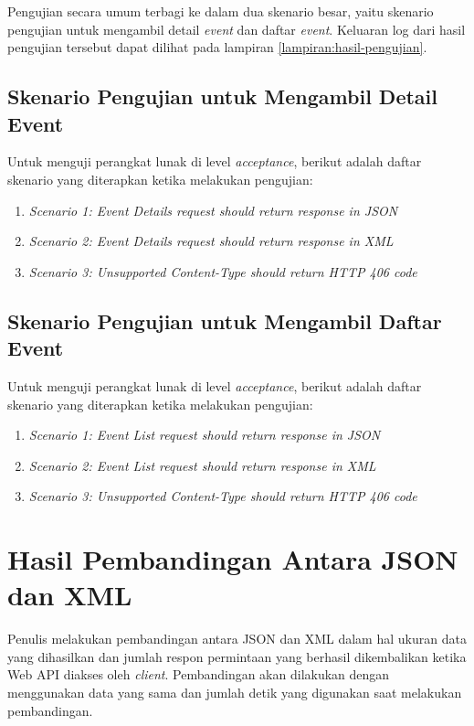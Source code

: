 \documentclass[a4paper, 12pt, oneside]{report}
\begin{document}
Pengujian secara umum terbagi ke dalam dua skenario besar, yaitu skenario pengujian untuk mengambil detail \textit{event} dan daftar \textit{event}. Keluaran log dari hasil pengujian tersebut dapat dilihat pada lampiran \ref{lampiran:hasil-pengujian}.

\subsection{Skenario Pengujian untuk Mengambil Detail Event}

Untuk menguji perangkat lunak di level \textit{acceptance}, berikut adalah daftar skenario yang diterapkan ketika melakukan pengujian:

\begin{enumerate}
  \item \textit{Scenario 1: Event Details request should return response in JSON}
  \item \textit{Scenario 2: Event Details request should return response in XML}
  \item \textit{Scenario 3: Unsupported Content-Type should return HTTP 406 code}
\end{enumerate}

\subsection{Skenario Pengujian untuk Mengambil Daftar Event}

Untuk menguji perangkat lunak di level \textit{acceptance}, berikut adalah daftar skenario yang diterapkan ketika melakukan pengujian:

\begin{enumerate}
  \item \textit{Scenario 1: Event List request should return response in JSON}
  \item \textit{Scenario 2: Event List request should return response in XML}
  \item \textit{Scenario 3: Unsupported Content-Type should return HTTP 406 code}
\end{enumerate}

\section{Hasil Pembandingan Antara JSON dan XML}

Penulis melakukan pembandingan antara JSON dan XML dalam hal ukuran data yang dihasilkan dan jumlah respon permintaan yang berhasil dikembalikan ketika Web API diakses oleh \textit{client}. Pembandingan akan dilakukan dengan menggunakan data yang sama dan jumlah detik yang digunakan saat melakukan pembandingan.
\end{document}
